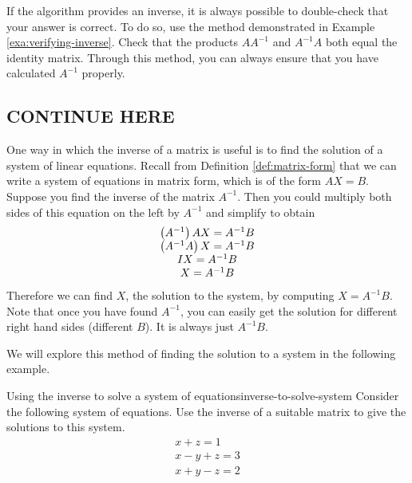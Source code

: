 If the algorithm provides an inverse, it is always possible to
double-check that your answer is correct.  To do so, use the method
demonstrated in Example \ref{exa:verifying-inverse}. Check that the
products $AA^{-1}$ and $A^{-1}A$ both equal the identity
matrix. Through this method, you can always ensure that you have
calculated $A^{-1}$ properly.

\subsection{CONTINUE HERE}

One way in which the inverse of a matrix is useful is to find the
solution of a system of linear equations.  Recall from Definition
\ref{def:matrix-form} that we can write a system of equations in
matrix form, which is of the form $AX=B$. Suppose you find the inverse
of the matrix $A^{-1}$. Then you could multiply both sides of this
equation on the left by $A^{-1}$ and simplify to obtain
\begin{equation*}
  \begin{array}{c}
    \left(A^{-1} \right) AX =A^{-1}B \\
    \left(A^{-1}A\right) X = A^{-1}B \\
    IX = A^{-1}B \\
    X = A^{-1}B
  \end{array}
\end{equation*}
Therefore we can find $X$, the solution to the system, by computing
$X=A^{-1}B$.  Note that once you have found $A^{-1}$, you can easily
get the solution for different right hand sides (different $B$). It is
always just $A^{-1}B$.

We will explore this method of finding the solution to a system in the
following example.

\begin{example}{Using the inverse to solve a system of equations}{inverse-to-solve-system}
  Consider the following system of equations. Use the inverse of a
  suitable matrix to give the solutions to this system.
  \begin{equation*}
    \begin{array}{c}
      x+z=1 \\
      x-y+z=3 \\
      x+y-z=2
    \end{array}
  \end{equation*}
\end{example}

